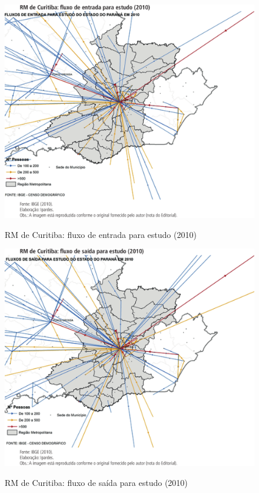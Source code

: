 	\begin{figure}
		\centering
		\caption{RM de Curitiba: fluxo de entrada para estudo (2010)}
		\includegraphics[width=1.0\linewidth]{img/costa2015a_07}
		\label{fig:costa2015a_07}
	\end{figure}

	\begin{figure}
		\centering
		\caption{RM de Curitiba: fluxo de saída para estudo (2010)}
		\includegraphics[width=1.0\linewidth]{img/costa2015a_08}
		\label{fig:costa2015a_08}
	\end{figure}
	
